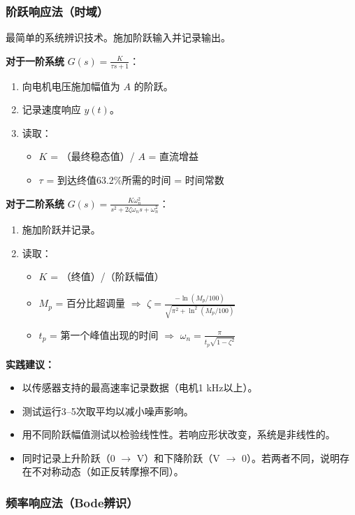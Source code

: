 \subsubsection{阶跃响应法（时域）}

最简单的系统辨识技术。施加阶跃输入并记录输出。

\textbf{对于一阶系统} $G(s) = \frac{K}{\tau s + 1}$：
\begin{enumerate}
    \item 向电机电压施加幅值为 $A$ 的阶跃。
    \item 记录速度响应 $y(t)$。
    \item 读取：
    \begin{itemize}[nosep]
        \item $K$ = （最终稳态值）/ $A$ = 直流增益
        \item $\tau$ = 到达终值63.2\%所需的时间 = 时间常数
    \end{itemize}
\end{enumerate}

\textbf{对于二阶系统} $G(s) = \frac{K\omega_n^2}{s^2 + 2\zeta\omega_n s + \omega_n^2}$：
\begin{enumerate}
    \item 施加阶跃并记录。
    \item 读取：
    \begin{itemize}[nosep]
        \item $K$ = （终值）/（阶跃幅值）
        \item $M_p$ = 百分比超调量 $\Rightarrow$ $\zeta = \frac{-\ln(M_p/100)}{\sqrt{\pi^2 + \ln^2(M_p/100)}}$
        \item $t_p$ = 第一个峰值出现的时间 $\Rightarrow$ $\omega_n = \frac{\pi}{t_p \sqrt{1 - \zeta^2}}$
    \end{itemize}
\end{enumerate}

\textbf{实践建议：}
\begin{itemize}
    \item 以传感器支持的最高速率记录数据（电机1 kHz以上）。
    \item 测试运行3--5次取平均以减小噪声影响。
    \item 用不同阶跃幅值测试以检验线性性。若响应形状改变，系统是非线性的。
    \item 同时记录上升阶跃（0 $\to$ V）和下降阶跃（V $\to$ 0）。若两者不同，说明存在不对称动态（如正反转摩擦不同）。
\end{itemize}

\subsubsection{频率响应法（Bode辨识）}

